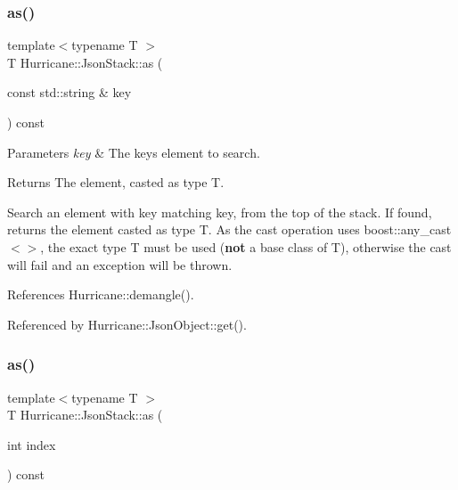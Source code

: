 \subsubsection{\texorpdfstring{as()}{as()}\hspace{0.1cm}{\footnotesize\ttfamily [1/2]}}
{\footnotesize\ttfamily template$<$typename T $>$ \\
T Hurricane\+::\+Json\+Stack\+::as (\begin{DoxyParamCaption}\item[{const std\+::string \&}]{key }\end{DoxyParamCaption}) const\hspace{0.3cm}{\ttfamily [inline]}}


\begin{DoxyParams}{Parameters}
{\em key} & The key\textquotesingle{}s element to search. \\
\hline
\end{DoxyParams}
\begin{DoxyReturn}{Returns}
The element, casted as type T.
\end{DoxyReturn}
Search an element with key matching {\ttfamily key}, from the top of the stack. If found, returns the element casted as type {\ttfamily T}. As the cast operation uses {\ttfamily boost\+::any\+\_\+cast$<$$>$}, the exact type {\ttfamily T} must be used ({\bfseries not} a base class of {\ttfamily T}), otherwise the cast will fail and an exception will be thrown. 

References Hurricane\+::demangle().



Referenced by Hurricane\+::\+Json\+Object\+::get().

\mbox{\label{classHurricane_1_1JsonStack_acc35d32ee522ff75b64122c40ee71113}} 
\subsubsection{\texorpdfstring{as()}{as()}\hspace{0.1cm}{\footnotesize\ttfamily [2/2]}}
{\footnotesize\ttfamily template$<$typename T $>$ \\
T Hurricane\+::\+Json\+Stack\+::as (\begin{DoxyParamCaption}\item[{int}]{index }\end{DoxyParamCaption}) const\hspace{0.3cm}{\ttfamily [inline]}}


